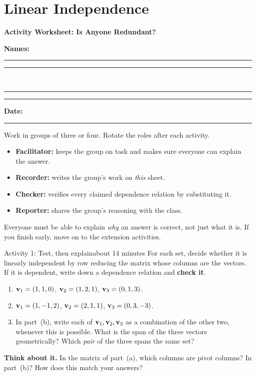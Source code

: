 \documentclass[11pt]{article}
\begin{document}
\section{Linear Independence}

{\Large\bfseries Activity Worksheet: Is Anyone Redundant?}\par

\textbf{Names:} \rule{2.4in}{0.4pt}\quad\rule{2.4in}{0.4pt}\\[6pt]
\hspace*{3.8em}\rule{2.4in}{0.4pt}\quad\rule{1.3in}{0.4pt}\quad\textbf{Date:} \rule{0.9in}{0.4pt}

\begin{roles}
Work in groups of three or four. Rotate the roles after each activity.
\begin{itemize}[nosep]
  \item \textbf{Facilitator:} keeps the group on task and makes sure everyone can explain the answer.
  \item \textbf{Recorder:} writes the group's work on \emph{this} sheet.
  \item \textbf{Checker:} verifies every claimed dependence relation by substituting it.
  \item \textbf{Reporter:} shares the group's reasoning with the class.
\end{itemize}
Everyone must be able to explain \emph{why} an answer is correct, not just what it is. If you finish
early, move on to the extension activities.
\end{roles}

\begin{activity}{Activity 1: Test, then explain}{about 14 minutes}
For each set, decide whether it is linearly independent by row reducing the matrix whose columns are the vectors. If it is dependent, write down a dependence relation and \textbf{check it}.
\begin{enumerate}[label=(\alph*),itemsep=6pt]
  \item $\mathbf{v}_1=(1,1,0)$, $\mathbf{v}_2=(1,2,1)$, $\mathbf{v}_3=(0,1,3)$.
        \workspace{1.3in}
  \item $\mathbf{v}_1=(1,-1,2)$, $\mathbf{v}_2=(2,1,1)$, $\mathbf{v}_3=(0,3,-3)$.
        \workspace{1.3in}
  \item In part~(b), write each of $\mathbf{v}_1,\mathbf{v}_2,\mathbf{v}_3$ as a combination of the other two, whenever this is possible. What is the span of the three vectors geometrically? Which \emph{pair} of the three spans the same set?
        \answerline
\end{enumerate}
\textbf{Think about it.} In the matrix of part~(a), which columns are pivot columns? In part~(b)? How does this match your answers?
\answerline\answerline
\end{activity}
\end{document}
